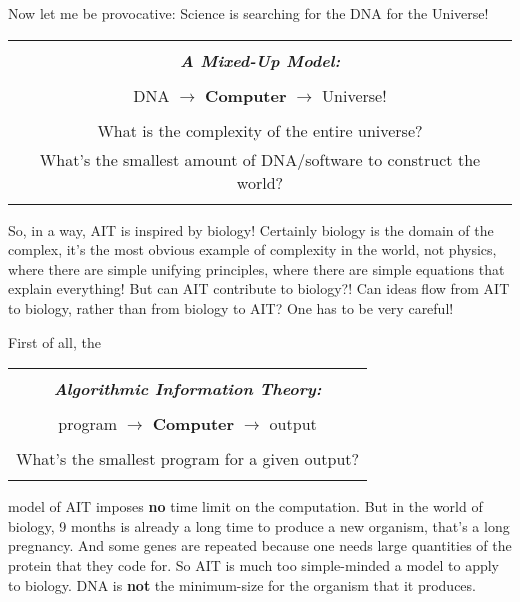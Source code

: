 \documentclass[12pt]{book}
\begin{document}
Now let me be provocative:
Science is searching for the DNA for the Universe!
 
\begin{center}
\begin{tabular}{|c|}
\hline
\\
\textbf{\emph{\large A Mixed-Up Model:}}
\\ \\
DNA $\longrightarrow$ \textbf{\large Computer} $\longrightarrow$ Universe!
\\ \\
What is the complexity of the entire universe?
\\
What's the smallest amount of DNA/software to construct the world?
\\
\\
\hline
\end{tabular}
\end{center}
 
So, in a way, AIT is inspired by biology!  
Certainly biology is the domain of the complex, 
it's the most obvious example of complexity in the world,
not physics, where there are simple unifying principles, 
where there are simple equations that explain everything!
But can AIT contribute to biology?!
Can ideas flow from AIT to biology, rather than from biology to AIT?
One has to be very careful!
 
First of all, the 
\begin{center}
\begin{tabular}{|c|}
\hline
\\
\textbf{\emph{\large Algorithmic Information Theory:}}
\\ \\
program $\longrightarrow$ \textbf{\large Computer} $\longrightarrow$ output 
\\ \\
What's the smallest program for a given output?
\\
\\
\hline
\end{tabular}
\end{center}
model of AIT imposes \textbf{no} time limit
on the computation. But in the world of biology, 9 months is already a long time to produce
a new organism, that's a long pregnancy. 
And some genes are repeated because one needs large quantities of the protein
that they code for.  So AIT is much too simple-minded a model to apply to biology.
DNA is \textbf{not} the minimum-size for the organism that it produces.  
 
\end{document}

